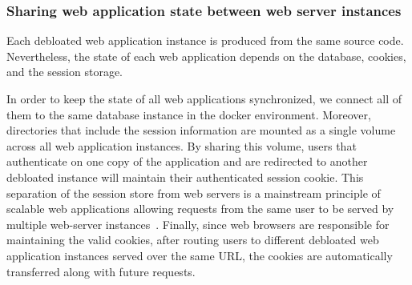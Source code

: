 \subsubsection{Sharing web application state between web server instances}

Each debloated web application instance is produced from the same source code. 
Nevertheless, the state of each web application depends on the database, cookies, and the session storage. 

In order to keep the state of all web applications synchronized, we connect all of them to the same database instance in the docker environment. 
Moreover, directories that include the session information are mounted as a single volume across all web application instances. 
By sharing this volume, users that authenticate on one copy of the application and are redirected to another debloated instance will maintain their authenticated session cookie. This separation of the session store from web servers is a mainstream principle of scalable web applications allowing requests from the same user to be served by multiple web-server instances~\cite{scalability-book}.
Finally, since web browsers are responsible for maintaining the valid cookies, after routing users to different debloated web application instances served over the same URL, the cookies are automatically transferred along with future requests. 
